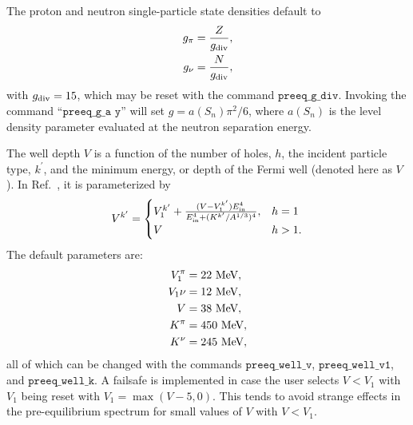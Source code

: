 \documentclass[
10pt,
showpacs,preprintnumbers,footinbib,
amsfonts,amsmath,amssymb,
aps,
prc,twocolumn,groupedaddress,superscriptaddress,
showkeys,
nofootinbib
]{revtex4-1}
\begin{document}
The proton and neutron single-particle state densities default to
\begin{align}
g_\pi & = \frac{Z}{g_{\rm div}},\\
g_\nu & = \frac{N}{g_{\rm div}},
\end{align}
with $g_{\rm div} = 15$, which may be reset with the command ${\texttt{preeq\_g\_div}}$. Invoking the command ``${\texttt{preeq\_g\_a y}}$'' will set $g = a(S_n)\pi^2/6$, where $a(S_n)$ is the level density parameter evaluated at the neutron separation energy.

The well depth $V$ is a function of the number of holes, $h$, the incident particle type, $k^\prime$, and the minimum energy,
or depth of the Fermi well (denoted here as $V$ ). In Ref.~\cite{Koning:2004}, it is parameterized by
\begin{equation}
V^{k^\prime} = 
\begin{cases}
V_1^{k^\prime} + \frac{(V-V_1^{k^\prime})E_{\rm in}^4}{E_{\rm in}^4 + (K^{k^\prime}/A^{1/3})^4}, & h = 1 \\
V  & h > 1.
\end{cases}
\end{equation}
The default parameters are:
\begin{align}
V_1^\pi & = 22~\text{MeV}, \notag \\
V_1\nu & = 12~\text{MeV}, \notag \\
V & = 38~\text{MeV}, \notag \\
K^\pi & = 450~\text{MeV}, \notag \\
K^\nu & = 245~\text{MeV}, 
\end{align}
all of which can be changed with the commands ${\texttt{preeq\_well\_v}}$, ${\texttt{preeq\_well\_v1}}$, and ${\texttt{preeq\_well\_k}}$. A failsafe is implemented
in case the user selects $V < V_1$ with $V_1$ being reset with $V_1 = \max(V-5,0)$. This tends to avoid
strange effects in the pre-equilibrium spectrum for small values of $V$ with $V < V_1$.
\end{document}
